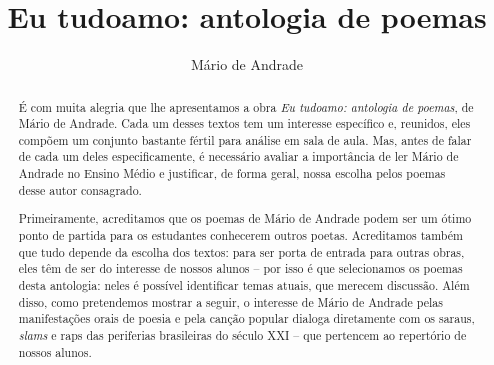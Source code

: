 \documentclass[11pt]{extarticle}
\begin{document}
\newcommand{\AutorLivro}{Mário de Andrade}
\newcommand{\TituloLivro}{Eu tudoamo: antologia de poemas}
\newcommand{\Tema}{Ficção, mistério e fantasia}
\newcommand{\Genero}{Poema}
\newcommand{\imagemCapa}{./images/PNLD0005-01.png}
\newcommand{\issnppub}{978-65-86974-23-2}
\newcommand{\issnepub}{978-65-86974-19-5}
\newcommand{\colaborador}{Carlos Rogério Duarte Barreiros}


\title{\TituloLivro}
\author{\AutorLivro}
\def\authornotes{\colaborador}

\date{}
\maketitle


\begin{abstract}

É com muita alegria que lhe apresentamos a obra \emph{Eu tudoamo: antologia de poemas},	
de Mário de Andrade. Cada um desses textos tem um
interesse específico e, reunidos, eles compõem um conjunto bastante
fértil para análise em sala de aula. Mas, antes de falar de cada um
deles especificamente, é necessário avaliar a importância de ler Mário
de Andrade no Ensino Médio e justificar, de forma geral, nossa escolha
pelos poemas desse autor consagrado.

Primeiramente, acreditamos que os poemas de Mário de Andrade podem ser
um ótimo ponto de partida para os estudantes conhecerem outros poetas.
Acreditamos também que tudo depende da escolha dos textos: para ser
porta de entrada para outras obras, eles têm de ser do interesse de
nossos alunos -- por isso é que selecionamos os poemas desta antologia:
neles é possível identificar temas atuais, que merecem discussão. Além
disso, como pretendemos mostrar a seguir, o interesse de Mário de
Andrade pelas manifestações orais de poesia e pela canção popular
dialoga diretamente com os saraus, \emph{slams} e raps das periferias
brasileiras do século XXI -- que pertencem ao repertório de nossos
alunos.


\end{abstract}
\end{document}
